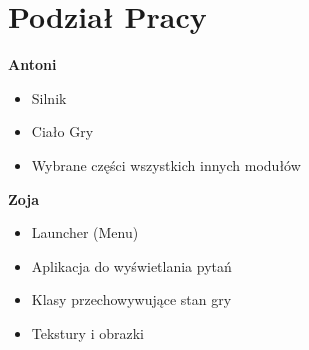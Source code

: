 \documentclass[12pt, titlepage]{article}
\begin{document}
\section{Podział Pracy}
\textbf{Antoni}
\begin{itemize}
	\item Silnik
	\item Ciało Gry
	\item Wybrane części
	      wszystkich innych
	      modułów
\end{itemize}
 
\noindent
\textbf{Zoja}
\begin{itemize}
	\item Launcher (Menu)
	\item Aplikacja do wyświetlania pytań
	\item Klasy przechowywujące stan gry
	\item Tekstury i obrazki
\end{itemize}
\end{document}
